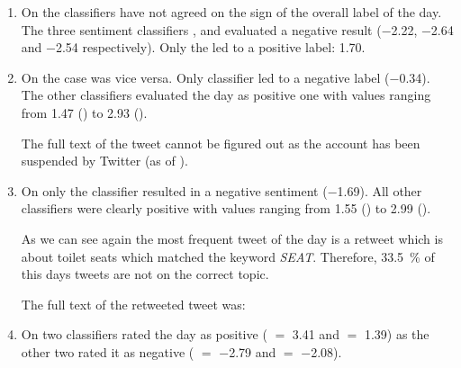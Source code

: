 \begin{enumerate}
    \item
        On  the classifiers have not agreed on the sign of the overall label of the day.
        The three sentiment classifiers \fnb{}, \fme{} and \fsvm{} evaluated a negative result (\num{-2.22}, \num{-2.64} and \num{-2.54} respectively).
        Only the \ftb{} led to a positive label: \num{1.70}.


    \item
        On  the case was vice versa.
        Only classifier \fnb{} led to a negative label (\num{-0.34}).
        The other classifiers evaluated the day as positive one with values ranging from \num{1.47} (\ftb{}) to \num{2.93} (\fsvm{}).


        The full text of the tweet cannot be figured out as the account has been suspended by Twitter (as of ).

    \item
        On  only the \tb{} classifier resulted in a negative sentiment (\num{-1.69}).
        All other classifiers were clearly positive with values ranging from \num{1.55} (\fme{}) to \num{2.99} (\fnb{}).


        As we can see again the most frequent tweet of the day is a retweet which is about toilet seats which matched the keyword \emph{SEAT}.
        Therefore, \SI{33.5}{\percent} of this days tweets are not on the correct topic.

        The full text of the retweeted tweet was:

    \item
        On  two classifiers rated the day as positive (\ftb{} $=$ \num{3.41} and \fme{} $=$ \num{1.39}) as the other two rated it as negative (\fnb{} $=$ \num{-2.79} and \fsvm{} $=$ \num{-2.08}).    


\end{enumerate}
